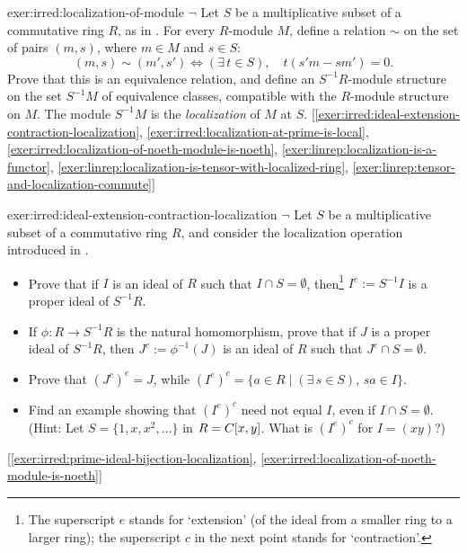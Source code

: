 \begin{exer}{}{exer:irred:localization-of-module}
  $\lnot$ Let $S$ be a multiplicative subset of a commutative ring
  $R$, as in . For every
  $R$-module $M$, define a relation $\sim$ on the set of pairs
  $(m, s)$, where $m \in M$ and $s \in S$:
  \[(m, s) \sim (m', s') \iff (\exists\, t \in S),\quad t(s'm - sm') =
    0.\] Prove that this is an equivalence relation, and define an
  $S^{-1}R$-module structure on the set $S^{-1}M$ of equivalence
  classes, compatible with the $R$-module structure on $M$. The module
  $S^{-1}M$ is the \emph{localization} of $M$ at
  $S$. [\ref{exer:irred:ideal-extension-contraction-localization},
  \ref{exer:irred:localization-at-prime-is-local},
  \ref{exer:irred:localization-of-noeth-module-is-noeth},
  \ref{exer:linrep:localization-is-a-functor},
  \ref{exer:linrep:localization-is-tensor-with-localized-ring},
  \ref{exer:linrep:tensor-and-localization-commute}]
\end{exer}
\begin{exer}{}{exer:irred:ideal-extension-contraction-localization}
  $\lnot$ Let $S$ be a multiplicative subset of a commutative ring
  $R$, and consider the localization operation introduced in
  .
  \begin{itemize}
  \item Prove that if $I$ is an ideal of $R$ such that
    $I \cap S = \emptyset$, then\footnote{The superscript $e$ stands
      for `extension' (of the ideal from a smaller ring to a larger
      ring); the superscript $c$ in the next point stands for
      `contraction'.}  $I^e := S^{-1}I$ is a proper ideal of
    $S^{-1}R$.
  \item If $\phi : R \to S^{-1}R$ is the natural homomorphism, prove
    that if $J$ is a proper ideal of $S^{-1}R$, then
    $J^c := \phi^{-1}(J)$ is an ideal of $R$ such that
    $J^c \cap S = \emptyset$.
  \item Prove that $(J^c)^e = J$, while
    $(I^e)^c = \{a \in R \mid (\exists\, s \in S),\, sa \in I\}$.
  \item Find an example showing that $(I^e)^c$ need not equal $I$,
    even if $I \cap S = \emptyset$. (Hint: Let
    $S = \{1, x, x^2, \dots\}$ in $R = C[x,y]$. What is $(I^e)^c$ for
    $I = (xy)$?)
  \end{itemize} [\ref{exer:irred:prime-ideal-bijection-localization},
  \ref{exer:irred:localization-of-noeth-module-is-noeth}]
\end{exer}

